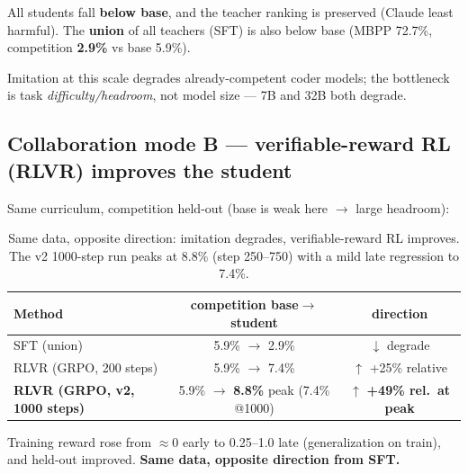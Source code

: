 \documentclass[11pt]{article}
\begin{document}
All students fall \textbf{below base}, and the teacher ranking is preserved (Claude least harmful).
The \textbf{union} of all teachers (SFT) is also below base (MBPP 72.7\%, competition \textbf{2.9\%}
vs base 5.9\%).

Imitation at this scale degrades already-competent coder models; the bottleneck is task
\emph{difficulty/headroom}, not model size --- 7B and 32B both degrade.

\subsection{Collaboration mode B --- verifiable-reward RL (RLVR) improves the student}
\label{sec:rlvr}
Same curriculum, competition held-out (base is weak here $\rightarrow$ large headroom):
\begin{table}[h]\centering
\begin{tabular}{lcc}
\toprule
Method & competition base$\rightarrow$student & direction \\
\midrule
SFT (union)              & 5.9\% $\rightarrow$ 2.9\%          & $\downarrow$ degrade \\
RLVR (GRPO, 200 steps)   & 5.9\% $\rightarrow$ 7.4\%          & $\uparrow$ +25\% relative \\
\textbf{RLVR (GRPO, v2, 1000 steps)} & 5.9\% $\rightarrow$ \textbf{8.8\%} peak (7.4\% @1000) & $\uparrow$ \textbf{+49\% rel.\ at peak} \\
\bottomrule
\end{tabular}
\caption{Same data, opposite direction: imitation degrades, verifiable-reward RL improves.
The v2 1000-step run peaks at 8.8\% (step 250--750) with a mild late regression to 7.4\%.}
\end{table}

Training reward rose from $\approx$0 early to 0.25--1.0 late (generalization on train), and
held-out improved. \textbf{Same data, opposite direction from SFT.}
\end{document}
